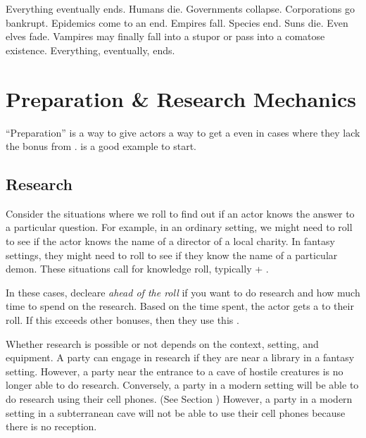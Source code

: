 Everything eventually ends.
Humans die.
Governments collapse.
Corporations go bankrupt.
Epidemics come to an end.
Empires fall.
Species end.
Suns die. Even elves fade.
Vampires may finally fall into a stupor or pass into a comatose existence.
Everything, eventually, ends.


\section{Preparation \& Research Mechanics}

``Preparation'' is a way to give actors a way to get a 
even in cases where they lack the bonus from .
 is a good example to start.

\subsection{Research}
\label{subsec:research_mechanic}

\begin{marginNote}
	
\end{marginNote}

Consider the situations where we roll to find out if an actor knows the answer
to a particular question. For example, in an ordinary setting, we might need
to roll to see if the actor knows the name of a director of a local charity.
In fantasy settings, they might need to roll to see if they know the name of
a particular demon. These situations call for knowledge roll, typically
 + .

In these cases, decleare \emph{ahead of the roll} if you want to do research and how
much time to spend on the research. Based on the time spent, the actor gets a 
to their roll. If this  exceeds other bonuses, then they use this
.

Whether research is possible or not depends on the context, setting, and equipment.
A party can engage in research if they are near a library in a fantasy setting.
However, a party near the entrance to a cave of hostile creatures is no longer able to do research.
Conversely, a party in a modern setting will be able to do research using their cell phones. (See Section )
However, a party in a modern setting in a subterranean cave will not be able to use their cell phones because there is no reception.


